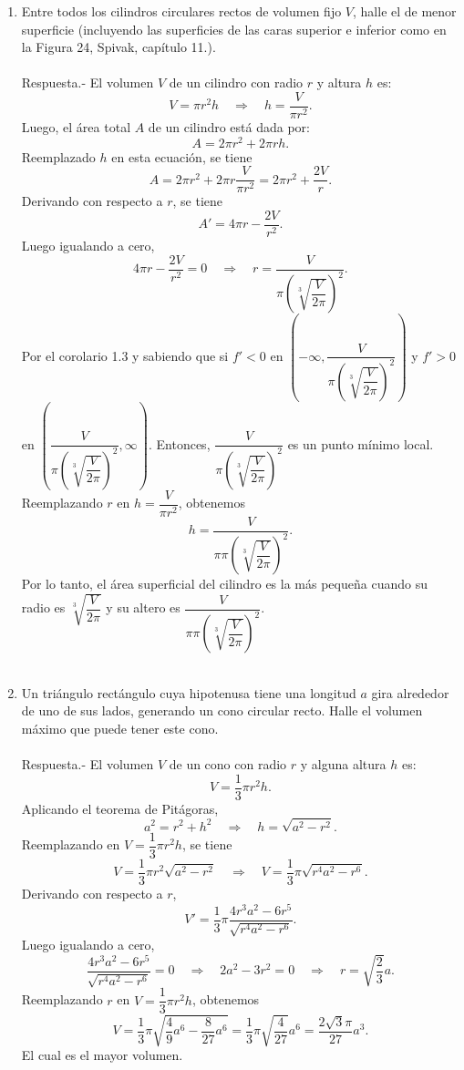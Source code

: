 \begin{enumerate}[\bfseries 1.]
    \item Entre todos los cilindros circulares rectos de volumen fijo $V$, halle el de menor superficie (incluyendo las superficies de las caras superior e inferior como en la Figura 24, Spivak, capítulo 11.).\\\\
	Respuesta.-\; El volumen $V$ de un cilindro con radio $r$ y altura $h$ es:
	$$V=\pi r^2h \quad \Rightarrow \quad h=\dfrac{V}{\pi r^2}.$$
	Luego, el área total $A$ de un cilindro está dada por:
	$$A=2\pi r^2+2\pi rh.$$
	Reemplazado $h$  en esta ecuación, se tiene
	$$A=2\pi r^2+2\pi r\dfrac{V}{\pi r^2}=2\pi r^2+\dfrac{2V}{r}.$$
	Derivando con respecto a $r$, se tiene
	$$A'=4\pi r - \dfrac{2V}{r^2}.$$
	Luego igualando a cero,
	$$4\pi r - \dfrac{2V}{r^2}=0\quad \Rightarrow \quad r=\dfrac{V}{\pi\left(\sqrt[3]{\dfrac{V}{2\pi}}\right)^2}.$$
	Por el corolario 1.3 y sabiendo que si $f'<0$ en $\left(-\infty,\dfrac{V}{\pi\left(\sqrt[3]{\dfrac{V}{2\pi}}\right)^2}\right)$  y $f'>0$ en $\left(\dfrac{V}{\pi\left(\sqrt[3]{\dfrac{V}{2\pi}}\right)^2},\infty\right)$. Entonces, $\dfrac{V}{\pi\left(\sqrt[3]{\dfrac{V}{2\pi}}\right)^2}$ es un punto mínimo local.\\
	Reemplazando $r$ en $h=\dfrac{V}{\pi r^2}$, obtenemos 
	$$h=\dfrac{V}{\pi\pi\left(\sqrt[3]{\dfrac{V}{2\pi}}\right)^2}.$$
	Por lo tanto, el área superficial del cilindro es la más pequeña cuando su radio es $\sqrt[3]{\dfrac{V}{2\pi}}$ y su altero es $\dfrac{V}{\pi\pi\left(\sqrt[3]{\dfrac{V}{2\pi}}\right)^2}$.\\\\

    \item Un triángulo rectángulo cuya hipotenusa tiene una longitud $a$ gira alrededor de uno de sus lados, generando un cono circular recto. Halle el volumen máximo que puede tener este cono.\\\\
	Respuesta.-\; El volumen $V$ de un cono con radio $r$ y alguna altura $h$ es:
	$$V=\dfrac{1}{3}\pi r^2 h.$$
	Aplicando el teorema de Pitágoras,
	$$a^2=r^2+h^2 \quad \Rightarrow \quad h=\sqrt{a^2-r^2}.$$
	Reemplazando en $V=\dfrac{1}{3}\pi r^2 h$, se tiene
	$$V=\dfrac{1}{3}\pi r^2 \sqrt{a^2-r^2}\quad \Rightarrow\quad V=\dfrac{1}{3}\pi\sqrt{r^4a^2-r^6}.$$
	Derivando con respecto a $r$, 
	$$V'=\dfrac{1}{3}\pi\dfrac{4r^3a^2-6r^5}{\sqrt{r^4a^2-r^6}}.$$
	Luego igualando a cero,
	$$\dfrac{4r^3a^2-6r^5}{\sqrt{r^4a^2-r^6}}=0\quad \Rightarrow \quad 2a^2-3r^2=0 \quad \Rightarrow \quad r=\sqrt{\dfrac{2}{3}}a.$$
	Reemplazando $r$ en $V=\dfrac{1}{3}\pi r^2 h$, obtenemos 
	$$V=\dfrac{1}{3}\pi\sqrt{\dfrac{4}{9}a^6-\dfrac{8}{27}a^6}=\dfrac{1}{3}\pi\sqrt{\dfrac{4}{27}}a^6=\dfrac{2\sqrt{3}\pi}{27}a^3.$$
	El cual es el mayor volumen.\\\\


\end{enumerate}
